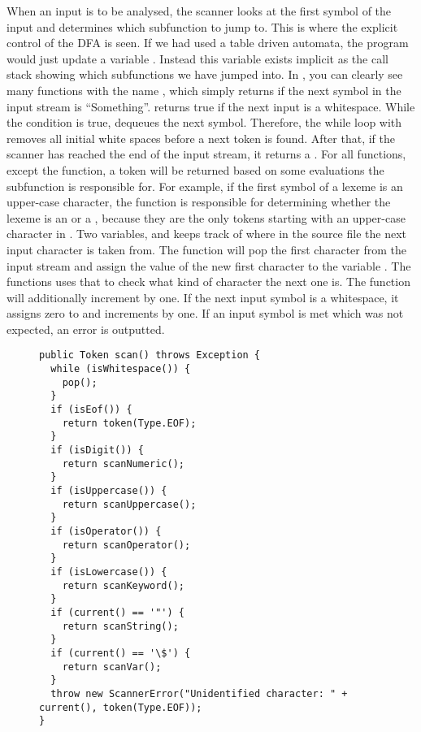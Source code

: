 When an input is to be analysed, the scanner looks at the first symbol of the input and determines which subfunction to jump to. 
This is where the explicit control of the DFA is seen. If we had used a table driven automata, the program would just update a variable . 
Instead this variable exists implicit as the call stack showing which subfunctions we have jumped into. In , you can clearly see many functions with the name , which simply returns if the next symbol in the input stream is ``Something''.  returns true if the next input is a whitespace.
While the condition is true,  dequeues the next symbol. Therefore, the while loop with  removes all initial white spaces before a next token is found. After that, if the scanner has reached the end of the input stream, it returns a . 
For all  functions, except the  function, a token will be returned based on some evaluations the subfunction is responsible for.
For example, if the first symbol of a lexeme is an upper-case character, the function  is responsible for determining whether the lexeme is an  or a , because they are the only tokens starting with an upper-case character in \productname{}. Two variables,   and   keeps track of where in the source file the next input character is taken from. The function  will pop the first character from the input stream and assign the value of the new first character to the variable . The  functions uses that  to check what kind of character the next one is.
The  function will additionally increment  by one. If the next input symbol is a whitespace, it assigns zero to   and increments  by one. If an input symbol is met which was not expected, an error is outputted.
\begin{figure}
\begin{lstlisting}
public Token scan() throws Exception {
  while (isWhitespace()) {
    pop();
  }
  if (isEof()) {
    return token(Type.EOF);
  }
  if (isDigit()) {
    return scanNumeric();
  }
  if (isUppercase()) {
    return scanUppercase();
  }
  if (isOperator()) {
    return scanOperator();
  }
  if (isLowercase()) {
    return scanKeyword();
  }
  if (current() == '"') {
    return scanString();
  }
  if (current() == '\$') {
    return scanVar();
  }
  throw new ScannerError("Unidentified character: " + current(), token(Type.EOF));
}
\end{lstlisting}
\label{lst:scan}
\end{figure}

